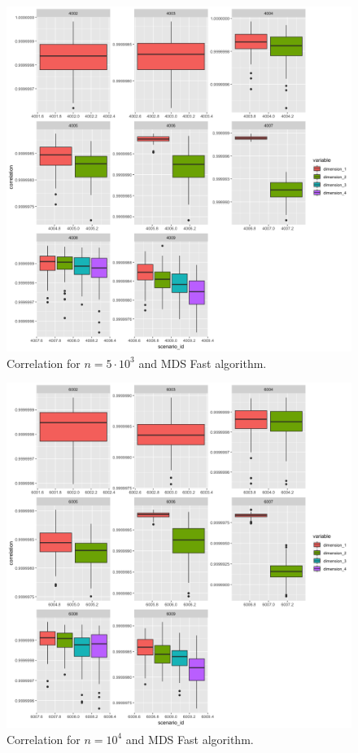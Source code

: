 \documentclass[11pt]{report}
\begin{document}
\begin{figure}[ht]
\centering
    \includegraphics[scale = 1.5]{./images/fast_correlation_5000.png}
    \caption{Correlation for $n = 5 \cdot 10^3$ and MDS Fast algorithm.}
    \label{fast_correlation_5000}
\end{figure}

\begin{figure}[ht]
\centering
    \includegraphics[scale = 1.5]{./images/fast_correlation_10000.png}
    \caption{Correlation for $n = 10^4$ and MDS Fast algorithm.}
    \label{fast_correlation_10000}
\end{figure}
\end{document}

